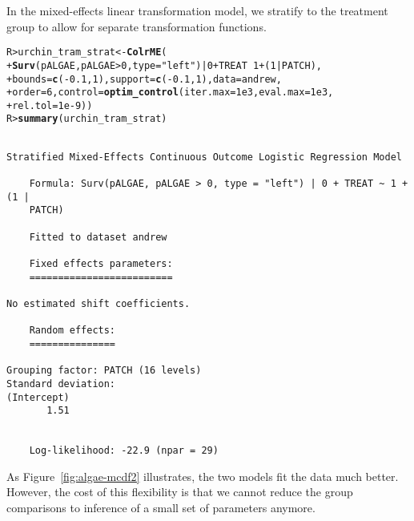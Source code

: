 \documentclass[11pt]{article}\usepackage[]{graphicx}\usepackage{xcolor}
\makeatletter
\newcommand{\hlnum}[1]{\textcolor[rgb]{0.686,0.059,0.569}{#1}}%
\newcommand{\hlstr}[1]{\textcolor[rgb]{0.192,0.494,0.8}{#1}}%
\newcommand{\hlopt}[1]{\textcolor[rgb]{0,0,0}{#1}}%
\newcommand{\hlstd}[1]{\textcolor[rgb]{0.345,0.345,0.345}{#1}}%
\newcommand{\hlkwb}[1]{\textcolor[rgb]{0.69,0.353,0.396}{#1}}%
\newcommand{\hlkwc}[1]{\textcolor[rgb]{0.333,0.667,0.333}{#1}}%
\newcommand{\hlkwd}[1]{\textcolor[rgb]{0.737,0.353,0.396}{\textbf{#1}}}%
\newenvironment{kframe}{%
 \def\at@end@of@kframe{}%
 \ifinner\ifhmode%
  \def\at@end@of@kframe{\end{minipage}}%
  \begin{minipage}{\columnwidth}%
 \fi\fi%
 \def\FrameCommand##1{\hskip\@totalleftmargin \hskip-\fboxsep
 \colorbox{shadecolor}{##1}\hskip-\fboxsep
     \hskip-\linewidth \hskip-\@totalleftmargin \hskip\columnwidth}%
 \MakeFramed {\advance\hsize-\width
   \@totalleftmargin\z@ \linewidth\hsize
   \@setminipage}}%
 {\par\unskip\endMakeFramed%
 \at@end@of@kframe}
\newenvironment{knitrout}{}{} %
\newcommand{\0}{{\mathbf{0}}}
\makeatother
\begin{document}
In the mixed-effects linear transformation model,
we stratify to the treatment group to allow for separate
transformation functions.
%
\begin{knitrout}\small
{}\color{fgcolor}\begin{kframe}
\begin{alltt}
\hlstd{R> }\hlstd{urchin_tram_strat} \hlkwb{<-} \hlkwd{ColrME}\hlstd{(}
\hlstd{+  }  \hlkwd{Surv}\hlstd{(pALGAE, pALGAE} \hlopt{>} \hlnum{0}\hlstd{,} \hlkwc{type} \hlstd{=} \hlstr{"left"}\hlstd{)} \hlopt{|} \hlnum{0} \hlopt{+} \hlstd{TREAT} \hlopt{~} \hlnum{1} \hlopt{+} \hlstd{(}\hlnum{1} \hlopt{|} \hlstd{PATCH),}
\hlstd{+  }  \hlkwc{bounds} \hlstd{=} \hlkwd{c}\hlstd{(}\hlopt{-}\hlnum{0.1}\hlstd{,} \hlnum{1}\hlstd{),} \hlkwc{support} \hlstd{=} \hlkwd{c}\hlstd{(}\hlopt{-}\hlnum{0.1}\hlstd{,} \hlnum{1}\hlstd{),} \hlkwc{data} \hlstd{= andrew,}
\hlstd{+  }  \hlkwc{order} \hlstd{=} \hlnum{6}\hlstd{,} \hlkwc{control} \hlstd{=} \hlkwd{optim_control}\hlstd{(}\hlkwc{iter.max} \hlstd{=} \hlnum{1e3}\hlstd{,} \hlkwc{eval.max} \hlstd{=} \hlnum{1e3}\hlstd{,}
\hlstd{+  }                                     \hlkwc{rel.tol} \hlstd{=} \hlnum{1e-9}\hlstd{))}
\hlstd{R> }\hlkwd{summary}\hlstd{(urchin_tram_strat)}
\end{alltt}
\begin{verbatim}

Stratified Mixed-Effects Continuous Outcome Logistic Regression Model

	Formula: Surv(pALGAE, pALGAE > 0, type = "left") | 0 + TREAT ~ 1 + (1 | 
    PATCH)

	Fitted to dataset andrew  

	Fixed effects parameters:
	=========================

No estimated shift coefficients.

	Random effects:
	===============

Grouping factor: PATCH (16 levels)
Standard deviation:
(Intercept) 
       1.51 


	Log-likelihood: -22.9 (npar = 29)
\end{verbatim}
\end{kframe}
\end{knitrout}



As Figure~\ref{fig:algae-mcdf2} illustrates,
the two models fit the data much better.
However, the cost of this flexibility is
that we cannot reduce the group comparisons
to inference of a small set of parameters anymore.
\end{document}
